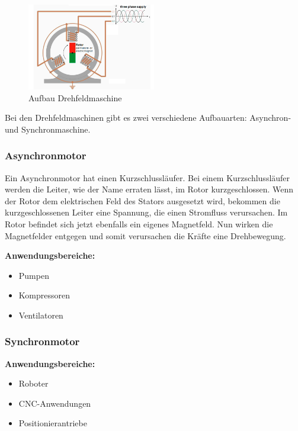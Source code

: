 \documentclass[12pt]{scrreprt} %
\begin{document}
\begin{figure}[!ht]
\begin{center}
	\caption{Aufbau Drehfeldmaschine}
	\includegraphics[width=0.5\textwidth]{Drehstrommotor}
\end{center}
\end{figure}

Bei den Drehfeldmaschinen gibt es zwei verschiedene Aufbauarten: Asynchron- und Synchronmaschine.

\subsubsection{Asynchronmotor}
\label{sec:asynchronmotor}

Ein Asynchronmotor hat einen Kurzschlussläufer.
Bei einem Kurzschlussläufer werden die Leiter, wie der Name erraten lässt, im Rotor kurzgeschlossen. Wenn der Rotor dem elektrischen Feld des Stators ausgesetzt wird, bekommen die kurzgeschlossenen Leiter eine Spannung, die einen Stromfluss verursachen. Im Rotor befindet sich jetzt ebenfalls ein eigenes Magnetfeld. Nun wirken die Magnetfelder entgegen und somit verursachen die Kräfte eine Drehbewegung. 

\textbf{Anwendungsbereiche:}

\begin{itemize}
	\item{Pumpen}
	\item{Kompressoren}
	\item{Ventilatoren}
\end{itemize}

\subsubsection{Synchronmotor}
\label{sec:synchronmotor}


\textbf{Anwendungsbereiche:}

\begin{itemize}
	\item{Roboter}
	\item{CNC-Anwendungen}
	\item{Positionierantriebe}
\end{itemize}
\end{document}

